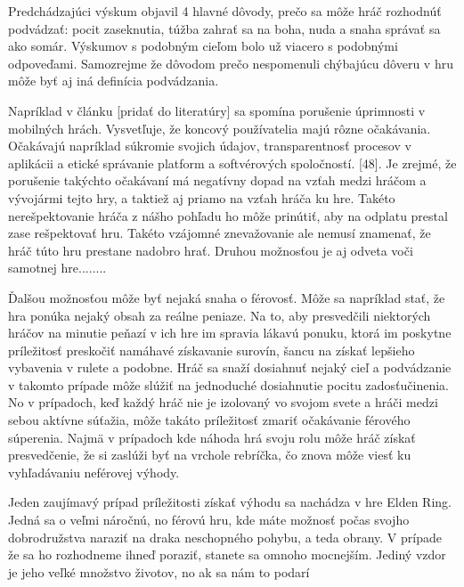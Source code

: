 \documentclass[10pt, oneside, slovak,a4paper]{article}
\begin{document}
Predchádzajúci výskum objavil 4 hlavné dôvody, prečo sa môže hráč rozhodnúť podvádzať: pocit zaseknutia, túžba zahrať sa na boha, nuda a snaha správať sa ako somár.\cite{mood} Výskumov s podobným cieľom bolo už viacero s podobnými odpoveďami. Samozrejme že dôvodom prečo nespomenuli chýbajúcu dôveru v hru môže byť aj iná definícia podvádzania.

Napríklad v článku [pridať do literatúry] sa spomína porušenie úprimnosti v mobilných hrách. Vysvetľuje, že koncový používatelia majú rôzne očakávania. Očakávajú napríklad súkromie svojich údajov, transparentnosť procesov v aplikácii a etické správanie platform a softvérových spoločností. [48]. Je zrejmé, že porušenie takýchto očakávaní má negatívny dopad na vzťah medzi hráčom a vývojármi tejto hry, a taktiež aj priamo na vzťah hráča ku hre. Takéto nerešpektovanie hráča z nášho pohľadu ho môže prinútiť, aby na odplatu prestal zase rešpektovať hru. Takéto vzájomné znevažovanie ale nemusí znamenať, že hráč túto hru prestane nadobro hrať. Druhou možnosťou je aj odveta voči samotnej hre........

Ďalšou možnosťou môže byť nejaká snaha o férovosť. Môže sa napríklad stať, že hra ponúka nejaký obsah za reálne peniaze. Na to, aby presvedčili niektorých hráčov na minutie peňazí v ich hre im spravia lákavú ponuku, ktorá im poskytne príležitosť preskočiť namáhavé získavanie surovín, šancu na získať lepšieho vybavenia v rulete a podobne. Hráč sa snaží dosiahnuť nejaký cieľ a podvádzanie v takomto prípade môže slúžiť na jednoduché dosiahnutie pocitu zadosťučinenia. No v prípadoch, keď každý hráč nie je izolovaný vo svojom svete a hráči medzi sebou aktívne súťažia, môže takáto príležitosť zmariť očakávanie férového súperenia. Najmä v prípadoch kde náhoda hrá svoju rolu môže hráč získať presvedčenie, že si zaslúži byť na vrchole rebríčka, čo znova môže viesť ku vyhľadávaniu neférovej výhody.

Jeden zaujímavý prípad príležitosti získať výhodu sa nachádza v hre Elden Ring. Jedná sa o veľmi náročnú, no férovú hru, kde máte možnosť počas svojho dobrodružstva naraziť na draka neschopného pohybu, a teda obrany. V prípade že sa ho rozhodneme ihneď  poraziť, stanete sa omnoho mocnejším. Jediný vzdor je jeho veľké množstvo životov, no ak sa nám to podarí 


\end{document}
